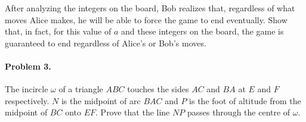 \documentclass[12pt]{article}
\begin{document}
After analyzing the integers on the board, Bob realizes that, regardless of what moves Alice makes, he will be able to force the game to end eventually. Show that, in fact, for this value of $a$ and these integers on the board, the game is guaranteed to end regardless of Alice's or Bob's moves.

\paragraph{\textbf{Problem 3.}} The incircle $\omega$ of a triangle $ABC$ touches the sides $AC$ and $BA$ at $E$ and $F$ respectively. $N$ is the midpoint of arc $BAC$ and $P$ is the foot of altitude from the midpoint of $BC$ onto $EF$. Prove that the line $NP$ passes through the centre of $\omega$.
\end{document}
